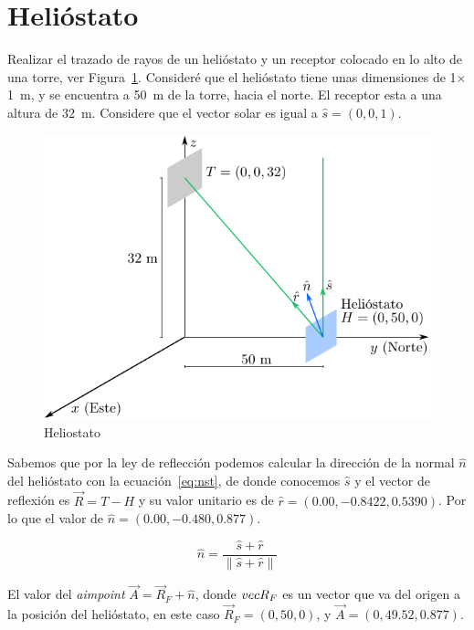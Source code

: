\section{Helióstato}
\label{sec:helio}

\begin{problem}
  Realizar el trazado de rayos de un helióstato y un receptor colocado en lo alto de una torre, ver Figura~\ref{fig:helio}. Consideré que el helióstato tiene unas dimensiones de 1$\times$1~m, y se encuentra a 50~m de la torre, hacia el norte. El receptor esta a una altura de 32~m. Considere que el vector solar es igual a $\hat s = (0, 0, 1)$.
\end{problem}

\begin{figure}[ht]
  \centering
  \includegraphics[width=1.0\textwidth]{figures/helio}
  \caption{\label{fig:helio} Heliostato}
\end{figure}


\TheSolution Sabemos que por la ley de reflección podemos calcular la dirección de la normal $\hat n$ del helióstato con la ecuación~\ref{eq:nst}, de donde conocemos $\hat s$ y el vector de reflexión es $\vec R = T - H$ y su valor unitario es de $\hat r = (0.00, -0.8422, 0.5390)$. Por lo que el valor de $\hat n = (0.00, -0.480, 0.877)$.

\begin{equation}
  \label{eq:nst}
  \hat n = \dfrac{\hat s + \hat r}{\| \hat s + \hat r \|}
\end{equation}

El valor del \emph{aimpoint} $\vec A = \vec R_F + \hat n$, donde $\\vec R_F$ es un vector que va del origen a la posición del helióstato, en este caso $\vec R_F = (0, 50, 0)$, y $\vec A = (0, 49.52, 0.877)$.

